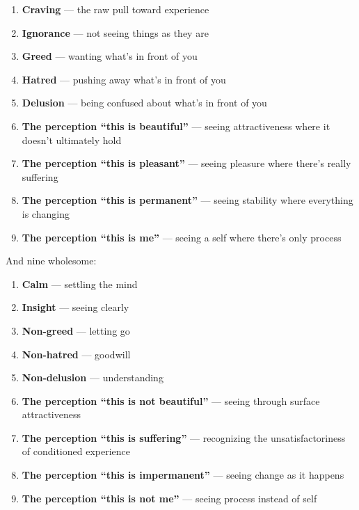 \begin{enumerate}[itemsep=2pt]
\item \textbf{Craving} --- the raw pull toward experience
\item \textbf{Ignorance} --- not seeing things as they are
\item \textbf{Greed} --- wanting what's in front of you
\item \textbf{Hatred} --- pushing away what's in front of you
\item \textbf{Delusion} --- being confused about what's in front of you
\item \textbf{The perception ``this is beautiful''} --- seeing attractiveness where it doesn't ultimately hold
\item \textbf{The perception ``this is pleasant''} --- seeing pleasure where there's really suffering
\item \textbf{The perception ``this is permanent''} --- seeing stability where everything is changing
\item \textbf{The perception ``this is me''} --- seeing a self where there's only process
\end{enumerate}

And nine wholesome:

\begin{enumerate}[itemsep=2pt]
\item \textbf{Calm} --- settling the mind
\item \textbf{Insight} --- seeing clearly
\item \textbf{Non-greed} --- letting go
\item \textbf{Non-hatred} --- goodwill
\item \textbf{Non-delusion} --- understanding
\item \textbf{The perception ``this is not beautiful''} --- seeing through surface attractiveness
\item \textbf{The perception ``this is suffering''} --- recognizing the unsatisfactoriness of conditioned experience
\item \textbf{The perception ``this is impermanent''} --- seeing change as it happens
\item \textbf{The perception ``this is not me''} --- seeing process instead of self
\end{enumerate}

